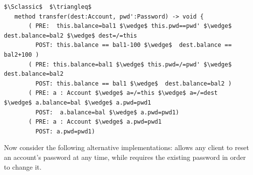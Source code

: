 \begin{lstlisting}[mathescape=true, frame=lines, language=Chainmail]
$\Sclassic$  $\triangleq$
   method transfer(dest:Account, pwd':Password) -> void {
       ( PRE:  this.balance=bal1 $\wedge$ this.pwd==pwd' $\wedge$ dest.balance=bal2 $\wedge$ dest=/=this 
         POST: this.balance == bal1-100 $\wedge$  dest.balance == bal2+100 )
       ( PRE: this.balance=bal1 $\wedge$ this.pwd=/=pwd' $\wedge$ dest.balance=bal2
         POST: this.balance == bal1 $\wedge$  dest.balance=bal2 )
       ( PRE: a : Account $\wedge$ a=/=this $\wedge$ a=/=dest  $\wedge$ a.balance=bal $\wedge$ a.pwd=pwd1
         POST:  a.balance=bal $\wedge$ a.pwd=pwd1)
       ( PRE: a : Account $\wedge$ a.pwd=pwd1  
         POST: a.pwd=pwd1)       
\end{lstlisting}
 
 

Now consider the following alternative implementations:
\ModB allows any client to reset an account's password at any time, while
\ModC requires the existing password in order to change it.


  
%
  
  

